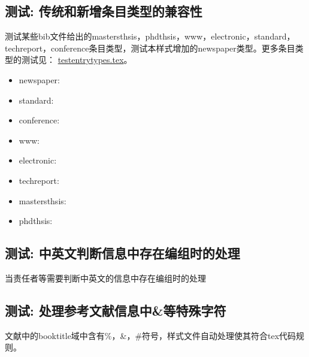 \subsection{测试: 传统和新增条目类型的兼容性}
\label{sec:entrytype:compatibility}
\begin{refsection}
测试某些bib文件给出的mastersthsis，phdthsis，www，electronic，standard，techreport，conference条目类型，测试本样式增加的newspaper类型。更多条目类型的测试见：
\href{run:/example/testentrytypes.tex}{testentrytypes.tex}。

\begin{itemize}
  \item newspaper:\cite{张田勤2000--}
  \item standard:\cite{全国文献工作标准化委员会第七分委员会1986--,国家标准局信息分类编码研究所1988-59-92}
  \item conference:\cite{Li2004-21-24}
  \item www:\cite{萧钰2001--}
  \item electronic:\cite{OMG2003--}
  \item techreport:\cite{Humphrey1971--}
  \item mastersthsis:\cite{张志祥1998--}
  \item phdthsis:\cite{张若凌2004--}
\end{itemize}

\printbibliography[heading=subbibliography,title=【兼容phdthsis等条目类型】]
\end{refsection}

\subsection{测试: 中英文判断信息中存在编组时的处理}
\begin{refsection}
当责任者等需要判断中英文的信息中存在编组时的处理
\cite{IFLAI1977b--,IFLAI1977--}
\cite{r27-BenHadjAlaya-FekiA.2008-1-5,中国企业投资协会2014--,中国企业投资协会2015--}

\printbibliography[heading=subbibliography,title=【中英文判断信息中存在编组的测试】]
\end{refsection}



\subsection{测试: 处理参考文献信息中\&等特殊字符}
\label{sec:entrytype:compatibility}
\begin{refsection}
文献中\cite{ref-replace-char}的booktitle域中含有\%，\&，\#符号，样式文件自动处理使其符合tex代码规则。
\printbibliography[heading=subbibliography,title=【处理参考文献信息中\&等特殊字符】]
\end{refsection}

